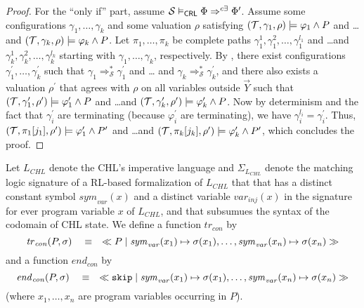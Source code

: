 \begin{proof}
For the ``only if'' part, assume $\mathcal{S} \vDash_{\mathsf{CRL}} \Phi \Rightarrow^{c\exists} \Phi^\prime$.
Assume some configurations $\gamma_1,\ldots,\gamma_k$ and some valuation $\rho$
satisfying $(\mathcal{T}, \gamma_1,\rho) \models \varphi_1 \land P$ and \ldots and $(\mathcal{T}, \gamma_k,\rho) \models \varphi_k \land P$.
Let $\pi_1, \ldots, \pi_k$ be complete paths
$\gamma_1^1,\gamma_1^2,\ldots,\gamma_1^{l_1}$ and \ldots and $\gamma_k^1,\gamma_k^2,\ldots,\gamma_k^{l_k}$
starting with $\gamma_1,\ldots,\gamma_k$, respectively.
By , there exist configurations $\gamma_1^\prime,\ldots,\gamma_k^\prime$
such that $\gamma_1 \Rightarrow_{\mathcal{S}}^* \gamma^\prime_1$
and \ldots
and $\gamma_k \Rightarrow_{\mathcal{S}}^* \gamma^\prime_k$,
and there also exists a valuation $\rho^\prime$
that agrees with $\rho$ on all variables outside $\vec{Y}$
such that
$(\mathcal{T}, \gamma^\prime_1, \rho^\prime) \models \varphi^\prime_1 \land P$
and \ldots and
$(\mathcal{T}, \gamma^\prime_k, \rho^\prime) \models \varphi^\prime_k \land P$.
Now by determinism and the fact that $\gamma^\prime_i$ are terminating (because $\varphi^\prime_i$ are terminating), we have
$\gamma^{l_i}_i = \gamma^\prime_i$.
Thus,
$(\mathcal{T}, \pi_1[j_1], \rho^\prime) \models \varphi^\prime_1 \land P^\prime$
and \ldots and $(\mathcal{T}, \pi_k[j_k], \rho^\prime) \models \varphi^\prime_k \land P^\prime$,
which concludes the proof.
\end{proof}

\begin{definition}
    Let $L_{\mathit{CHL}}$ denote the CHL's imperative language
    and $\Sigma_{L_{\mathit{CHL}}}$ denote the matching logic signature of a RL-based formalization of $L_{\mathit{CHL}}$
    that that has a distinct constant symbol $\mathit{sym}_\mathit{var}(x)$
    and a distinct variable $\mathit{var}_\mathit{inj}(x)$ in the signature
    for ever program variable $x$ of $L_{\mathit{CHL}}$,
    and that subsumues the syntax of the codomain of CHL state.
    We define a function $\mathit{tr}_{\mathit{con}}$ by
    \begin{equation*}
        \mathit{tr}_{\mathit{con}}(P, \sigma) \quad \equiv \quad
        \ll P\mid 
            \mathit{sym}_\mathit{var}(x_1) \mapsto \sigma(x_1),
            \ldots,
            \mathit{sym}_\mathit{var}(x_n) \mapsto \sigma(x_n)
        \gg
    \end{equation*}
    and a function $\mathit{end}_{\mathit{con}}$ by
    \begin{equation*}
        \mathit{end}_{\mathit{con}}(P, \sigma) \quad \equiv \quad
        \ll\texttt{skip}\mid 
            \mathit{sym}_\mathit{var}(x_1) \mapsto \sigma(x_1),
            \ldots,
            \mathit{sym}_\mathit{var}(x_n) \mapsto \sigma(x_n)
        \gg
    \end{equation*}
    (where $x_1,\ldots,x_n$ are program variables occurring in $P$).
\end{definition}

